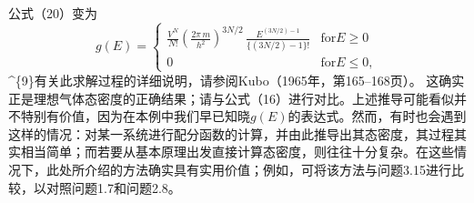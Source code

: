 公式（20）变为
\begin{equation}\tag{3.5.21}\label{eq:3.5.21}
g ( E ) = \left\{ \begin{array}{ll} { \frac { V ^{N} } { N ! } \left( \frac { 2 \pi \, m } { h ^{2} } \right) ^{3 N / 2} \, \frac { E ^{( 3 N / 2 ) - 1} } { \{ ( 3 N / 2 ) - 1 \} ! } } & { \mathrm { f o r }  E \geq 0 } \\{ 0 } & { \mathrm { f o r }  E \leq 0 , } \end{array} \right.
\end{equation}
\^{}\{9\}有关此求解过程的详细说明，请参阅Kubo（1965年，第165--168页）。
这确实正是理想气体态密度的正确结果；请与公式（16）进行对比。上述推导可能看似并不特别有价值，因为在本例中我们早已知晓\(g(E)\)的表达式。然而，有时也会遇到这样的情况：对某一系统进行配分函数的计算，并由此推导出其态密度，其过程其实相当简单；而若要从基本原理出发直接计算态密度，则往往十分复杂。在这些情况下，此处所介绍的方法确实具有实用价值；例如，可将该方法与问题3.15进行比较，以对照问题1.7和问题2.8。
